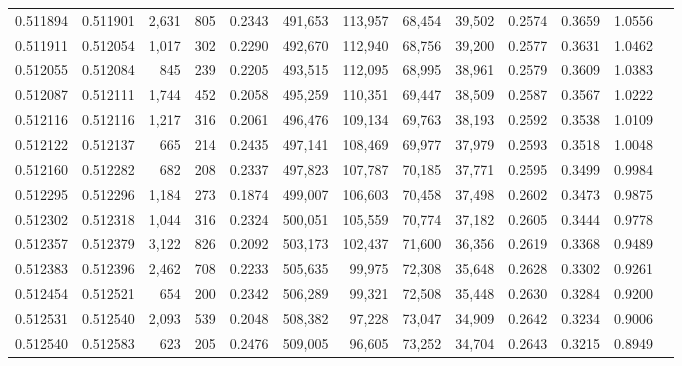 \begin{tabular}{rrrrrrrrrrrrr}
0.511894 & 0.511901 &  2,631 &   805 &                                     0.2343 & 491,653 & 113,957 &  68,454 &  39,502 & 0.2574 & 0.3659 & 1.0556 \\
0.511911 & 0.512054 &  1,017 &   302 &                                     0.2290 & 492,670 & 112,940 &  68,756 &  39,200 & 0.2577 & 0.3631 & 1.0462 \\
0.512055 & 0.512084 &    845 &   239 &                                     0.2205 & 493,515 & 112,095 &  68,995 &  38,961 & 0.2579 & 0.3609 & 1.0383 \\
0.512087 & 0.512111 &  1,744 &   452 &                                     0.2058 & 495,259 & 110,351 &  69,447 &  38,509 & 0.2587 & 0.3567 & 1.0222 \\
0.512116 & 0.512116 &  1,217 &   316 &                                     0.2061 & 496,476 & 109,134 &  69,763 &  38,193 & 0.2592 & 0.3538 & 1.0109 \\
0.512122 & 0.512137 &    665 &   214 &                                     0.2435 & 497,141 & 108,469 &  69,977 &  37,979 & 0.2593 & 0.3518 & 1.0048 \\
0.512160 & 0.512282 &    682 &   208 &                                     0.2337 & 497,823 & 107,787 &  70,185 &  37,771 & 0.2595 & 0.3499 & 0.9984 \\
0.512295 & 0.512296 &  1,184 &   273 &                                     0.1874 & 499,007 & 106,603 &  70,458 &  37,498 & 0.2602 & 0.3473 & 0.9875 \\
0.512302 & 0.512318 &  1,044 &   316 &                                     0.2324 & 500,051 & 105,559 &  70,774 &  37,182 & 0.2605 & 0.3444 & 0.9778 \\
0.512357 & 0.512379 &  3,122 &   826 &                                     0.2092 & 503,173 & 102,437 &  71,600 &  36,356 & 0.2619 & 0.3368 & 0.9489 \\
0.512383 & 0.512396 &  2,462 &   708 &                                     0.2233 & 505,635 &  99,975 &  72,308 &  35,648 & 0.2628 & 0.3302 & 0.9261 \\
0.512454 & 0.512521 &    654 &   200 &                                     0.2342 & 506,289 &  99,321 &  72,508 &  35,448 & 0.2630 & 0.3284 & 0.9200 \\
0.512531 & 0.512540 &  2,093 &   539 &                                     0.2048 & 508,382 &  97,228 &  73,047 &  34,909 & 0.2642 & 0.3234 & 0.9006 \\
0.512540 & 0.512583 &    623 &   205 &                                     0.2476 & 509,005 &  96,605 &  73,252 &  34,704 & 0.2643 & 0.3215 & 0.8949 \\

\end{tabular}
